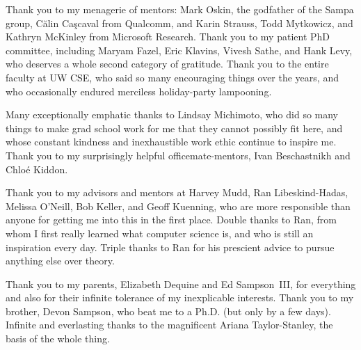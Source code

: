 Thank you to my menagerie of mentors:
Mark Oskin, the godfather of the Sampa group,
Călin Caşcaval from Qualcomm,
and
Karin Strauss, Todd Mytkowicz, and Kathryn McKinley from Microsoft Research.
Thank you to my patient PhD committee, including
Maryam Fazel, Eric Klavins, Vivesh Sathe, and Hank Levy, who deserves a whole
second category of gratitude.
Thank you to the entire faculty at UW CSE, who said so many encouraging things
over the years, and who occasionally endured merciless holiday-party
lampooning.

Many exceptionally emphatic thanks to Lindsay Michimoto, who did so many
things to make grad school work for me that they cannot possibly fit here, and
whose constant kindness and inexhaustible work ethic continue to inspire me.
Thank you to my surprisingly helpful officemate-mentors, Ivan Beschastnikh and
Chloé Kiddon.

Thank you to my advisors and mentors at Harvey Mudd,
Ran Libeskind-Hadas,
Melissa O'Neill,
Bob Keller,
and Geoff Kuenning,
who are more responsible than anyone for getting me into this in the first
place.
Double thanks to Ran, from whom I first really learned what computer science
is, and who is still an inspiration every day.
Triple thanks to Ran for his prescient advice to pursue anything else over
theory.

Thank you to my parents, Elizabeth Dequine and Ed Sampson~III, for everything
and also for their infinite tolerance of my inexplicable interests.
Thank you to my brother, Devon Sampson, who beat me to a Ph.D. (but only by a
few days).
Infinite and everlasting thanks to the magnificent Ariana Taylor-Stanley, the
basis of the whole thing.
